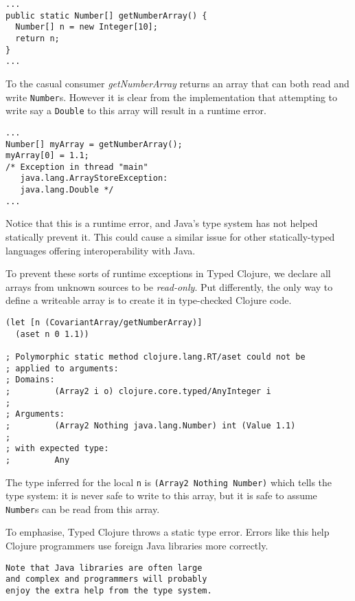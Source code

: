 \documentclass[preprint,10pt]{sigplanconf}
\begin{document}
\begin{lstlisting}
...
public static Number[] getNumberArray() {
  Number[] n = new Integer[10];
  return n;
}
...
\end{lstlisting}

To the casual consumer \emph{getNumberArray} returns an array that can both
read and write \lstinline|Number|s. However it is clear from the implementation
that attempting to write say a \lstinline|Double| to this array will result
in a runtime error.

\begin{verbatim}
...
Number[] myArray = getNumberArray();
myArray[0] = 1.1;
/* Exception in thread "main" 
   java.lang.ArrayStoreException: 
   java.lang.Double */
...
\end{verbatim}

Notice that this is a runtime error, and Java's type system has not helped
statically prevent it.
This could cause a similar issue for other statically-typed languages offering
interoperability with Java. 

To prevent these sorts of runtime exceptions in Typed Clojure, we declare
all arrays from unknown sources to be \emph{read-only}. Put differently,
the only way to define a writeable array is to create it in type-checked Clojure
code.

\begin{lstlisting}
(let [n (CovariantArray/getNumberArray)]
  (aset n 0 1.1))

; Polymorphic static method clojure.lang.RT/aset could not be 
; applied to arguments:
; Domains: 
;         (Array2 i o) clojure.core.typed/AnyInteger i
; 
; Arguments:
;         (Array2 Nothing java.lang.Number) int (Value 1.1)
; 
; with expected type:
;         Any
\end{lstlisting}

The type inferred for the local \lstinline|n| is \lstinline|(Array2 Nothing Number)|
which tells the type system: it is never safe to write to this array, but
it is safe to assume \lstinline|Number|s can be read from this array.

To emphasise, Typed Clojure throws a static type error. Errors like this help Clojure programmers
use foreign Java libraries more correctly.

\begin{verbatim}
Note that Java libraries are often large 
and complex and programmers will probably
enjoy the extra help from the type system.
\end{verbatim}
\end{document}
